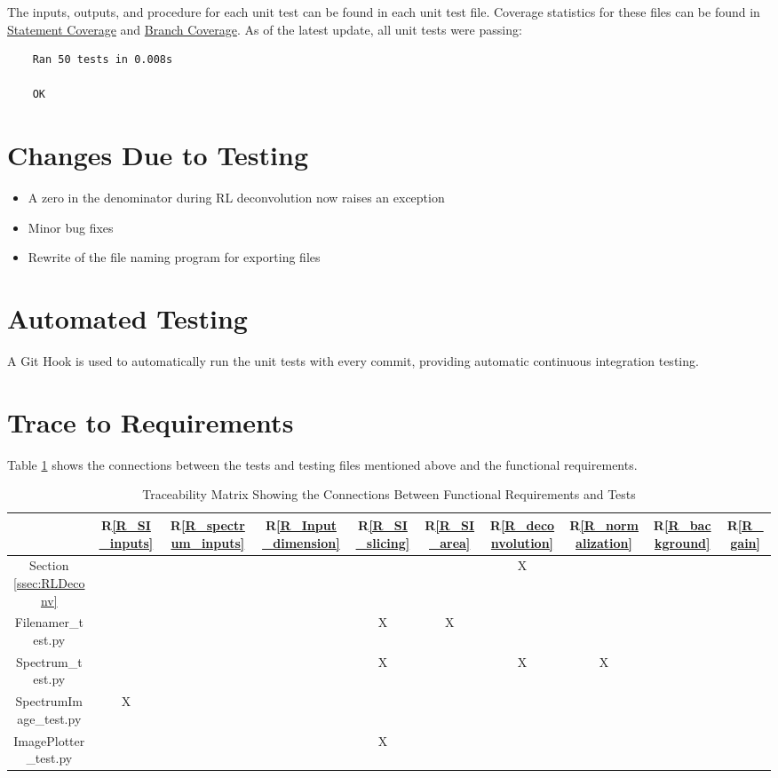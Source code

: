 \documentclass[12pt, titlepage]{article}
\newcommand{\rref}[1]{R\ref{#1}}
\begin{document}
The inputs, outputs, and procedure for each unit test can be found in each unit
test file. Coverage statistics for these files can be found in
\hyperref[ssec:StatCov]{Statement Coverage} and \hyperref[ssec:BrCov]{Branch
    Coverage}. As of the latest update, all unit tests were passing:

\begin{lstlisting}
    Ran 50 tests in 0.008s
    
    OK
\end{lstlisting}

\section{Changes Due to Testing}
\begin{itemize}
    \item A zero in the denominator during RL deconvolution now raises an
    exception
    \item Minor bug fixes
    \item Rewrite of the file naming program for exporting files
\end{itemize}

\section{Automated Testing}
A Git Hook is used to automatically run the unit tests with every commit,
providing automatic continuous integration testing.

\section{Trace to Requirements}
Table \ref{Table:R_trace} shows the connections between the tests and testing
files mentioned above and the functional requirements.

\begin{table}[h]
    \centering
    \begin{tabular}{|c|c|c|c|c|c|c|c|c|c|}
        \hline
        & \rref{R_SI_inputs} & \rref{R_spectrum_inputs} & \rref{R_Input_dimension}
        & \rref{R_SI_slicing} & \rref{R_SI_area} & \rref{R_deconvolution} &
        \rref{R_normalization} & \rref{R_background} & \rref{R_gain}\\
        \hline
         Section \ref{ssec:RLDeconv} & & & & & & X & & & \\ \hline
         Filenamer\_test.py & & & & X & X & & & & \\ \hline
         Spectrum\_test.py & & & & X & & X & X & & \\ \hline
         SpectrumImage\_test.py & X & & & & & & & & \\ \hline
         ImagePlotter\_test.py & & & & X & & & & & \\ \hline
    \end{tabular}
    \caption{Traceability Matrix Showing the Connections Between Functional
        Requirements and Tests}
    \label{Table:R_trace}
\end{table}
\end{document}
